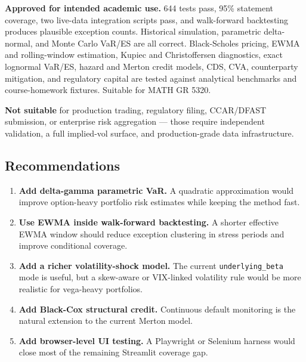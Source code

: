 \documentclass[11pt]{article}
\newcommand{\code}[1]{\texttt{#1}}
\begin{document}
\textbf{Approved for intended academic use.}  644 tests pass, 95\%
statement coverage, two live-data integration scripts pass, and
walk-forward backtesting produces plausible exception counts.
Historical simulation, parametric delta-normal, and Monte Carlo VaR/ES
are all correct.  Black-Scholes pricing, EWMA and rolling-window
estimation, Kupiec and Christoffersen diagnostics, exact lognormal
VaR/ES, hazard and Merton credit models, CDS, CVA, counterparty
mitigation, and regulatory capital are tested against analytical
benchmarks and course-homework fixtures.  Suitable for MATH GR 5320.

\textbf{Not suitable} for production trading, regulatory filing, CCAR/DFAST
submission, or enterprise risk aggregation --- those require independent
validation, a full implied-vol surface, and production-grade data
infrastructure.

\subsection{Recommendations}

\begin{enumerate}

\item \textbf{Add delta-gamma parametric VaR.}  A quadratic approximation
would improve option-heavy portfolio risk estimates while keeping the
method fast.

\item \textbf{Use EWMA inside walk-forward backtesting.}  A shorter
effective EWMA window should reduce exception clustering in stress
periods and improve conditional coverage.

\item \textbf{Add a richer volatility-shock model.}  The current
\code{underlying\_beta} mode is useful, but a skew-aware or VIX-linked
volatility rule would be more realistic for vega-heavy portfolios.

\item \textbf{Add Black-Cox structural credit.}  Continuous default
monitoring is the natural extension to the current Merton model.

\item \textbf{Add browser-level UI testing.}  A Playwright or Selenium
harness would close most of the remaining Streamlit coverage gap.

\end{enumerate}

\end{document}
